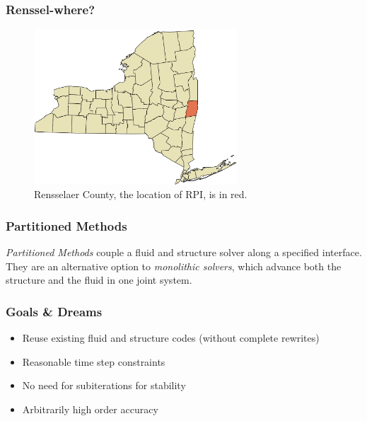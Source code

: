 \documentclass[8pt]{beamer}
\begin{document}
\begin{frame}
    \frametitle{Renssel-where?}

    \begin{figure}
        \includegraphics[width=3in]{rensselaer.png}

        \caption{Rensselaer County, the location of RPI, is in red.}
    \end{figure}
\end{frame}

\begin{frame}
    \frametitle{Partitioned Methods}
    \emph{Partitioned Methods} couple a fluid and structure solver along a
    specified interface. They are an alternative option to \emph{monolithic
    solvers}, which advance both the structure and the fluid in one joint
    system.
\end{frame}

\begin{frame}
    \frametitle{Goals \& Dreams}
    \begin{itemize}
        \item Reuse existing fluid and structure codes (without complete
              rewrites)
        \item Reasonable time step constraints
        \item No need for subiterations for stability
        \item Arbitrarily high order accuracy
    \end{itemize}
\end{frame}
\end{document}

